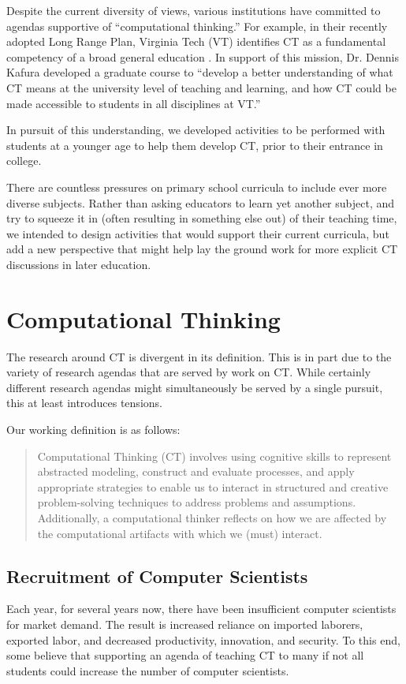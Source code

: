 \documentclass{acm_proc_article-sp}
\begin{document}
Despite the current diversity of views, various institutions have committed to agendas supportive of ``computational thinking.'' 
For example, in their recently adopted Long Range Plan, Virginia Tech (VT) identifies CT as a fundamental competency of a broad general education \cite{vtlongrange}. 
In support of this mission, Dr. Dennis Kafura developed a graduate course to ``develop a better understanding of what CT means at the university level of teaching and learning, and how CT could be made accessible to students in all disciplines at VT.''

In pursuit of this understanding, we developed activities to be performed with students at a younger age to help them develop CT, prior to their entrance in college.

There are countless pressures on primary school curricula to include ever more diverse subjects.
Rather than asking educators to learn yet another subject, and try to squeeze it in (often resulting in something else out) of their teaching time, we intended to design activities that would support their current curricula, but add a new perspective that might help lay the ground work for more explicit CT discussions in later education.

\section{Computational Thinking}
The research around CT is divergent in its definition.
This is in part due to the variety of research agendas that are served by work on CT.
While certainly different research agendas might simultaneously be served by a single pursuit, this at least introduces tensions. 

\begin{samepage}
Our working definition is as follows: 
\begin{quotation}
Computational Thinking (CT) involves using cognitive skills to represent abstracted modeling, construct and evaluate processes, and apply appropriate strategies to enable us to interact in structured and creative problem-solving techniques to address problems and assumptions.
Additionally, a computational thinker reflects on how we are affected by the computational artifacts with which we (must) interact.
\end{quotation}
\end{samepage}

\subsection{Recruitment of Computer Scientists}
Each year, for several years now, there have been insufficient computer scientists for market demand.
The result is increased reliance on imported laborers, exported labor, and decreased productivity, innovation, and security.
To this end, some believe that supporting an agenda of teaching CT to many if not all students could increase the number of computer scientists.
\end{document}
